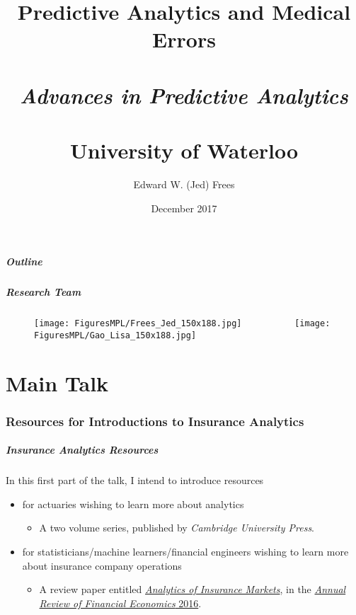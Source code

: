 \documentclass[serif,10pt]{beamer}
\title[Predictive Analytics and Medical Errors]{Predictive Analytics and Medical Errors \\
~\\
{\small{\textit{Advances in Predictive Analytics} \\
~ \\
University of Waterloo}}
}
\author[Frees]{Edward W. (Jed) Frees }
\institute [Univ Wisconsin] {
 Joint work with Lisa Gao \\
  ~~\\
  University of Wisconsin -- Madison    }
\date[December 2017]{December 2017}
\begin{document}
\frame{\titlepage}

\begin{frame}
  \frametitle{Outline}
     \tableofcontents[part=1]
\end{frame}

\begin{frame}
\frametitle{Research Team}
\begin{figure}[htp]
\texttt{[image: FiguresMPL/Frees\_Jed\_150x188.jpg]}
~~~~~~~~~~\texttt{[image: FiguresMPL/Gao\_Lisa\_150x188.jpg]}
\end{figure}
\end{frame}

\part<presentation>{Main Talk}



\section[Introduction]{Resources for Introductions to Insurance Analytics}

\begin{frame}\label{AnalyticsOverview}
\frametitle{Insurance Analytics Resources}

In this first part of the talk, I intend to introduce resources
  \begin{itemize}
  \item for actuaries wishing to learn more about analytics
  \begin{itemize}
\item  A two volume series, published by \textit{Cambridge University Press}.
\end{itemize}
\item for statisticians/machine learners/financial engineers wishing to learn more about insurance company operations
\begin{itemize}\item A review paper entitled \href{http://www.annualreviews.org/doi/abs/10.1146/annurev-financial-111914-041815}{\textit{Analytics of Insurance Markets}}, in the \href{http://www.annualreviews.org/journal/financial}{\textit{Annual Review of Financial Economics} 2016}.
\end{itemize}

\end{itemize}
\end{frame}
\end{document}
